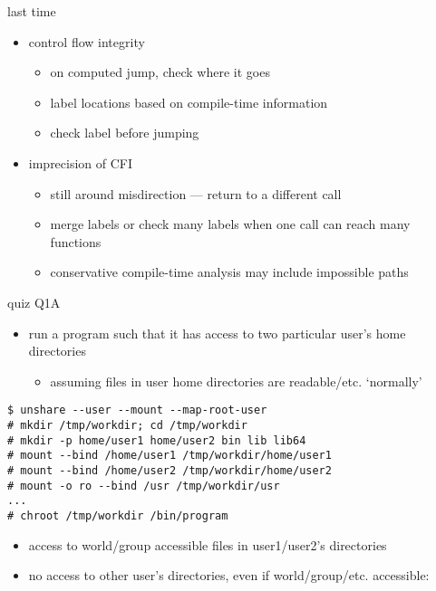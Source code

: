 \date{}
\title{}
\date{}

\begin{frame}
    \titlepage
\end{frame}

\begin{frame}{last time}
    \begin{itemize}
    \item control flow integrity
        \begin{itemize}
        \item on computed jump, check where it goes
        \item label locations based on compile-time information
        \item check label before jumping
        \end{itemize}
    \item imprecision of CFI
        \begin{itemize}
        \item still around misdirection --- return to a different call
        \item merge labels or check many labels when one call can reach many functions
        \item conservative compile-time analysis may include impossible paths
        \end{itemize}
    \end{itemize}
\end{frame}

\begin{frame}{quiz Q1A}
    \begin{itemize}
    \item run a program such that it has access to two particular user's home directories
        \begin{itemize}
        \item assuming files in user home directories are readable/etc. `normally'
        \end{itemize}
    \end{itemize}
\begin{Verbatim}[fontsize=\small]
$ unshare --user --mount --map-root-user
# mkdir /tmp/workdir; cd /tmp/workdir
# mkdir -p home/user1 home/user2 bin lib lib64
# mount --bind /home/user1 /tmp/workdir/home/user1
# mount --bind /home/user2 /tmp/workdir/home/user2
# mount -o ro --bind /usr /tmp/workdir/usr
...
# chroot /tmp/workdir /bin/program
\end{Verbatim}
    \begin{itemize}
    \item access to world/group accessible files in user1/user2's directories
    \item no access to other user's directories, even if world/group/etc. accessible:
    \end{itemize}
\end{frame}

